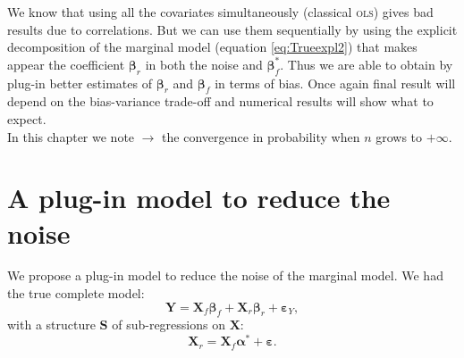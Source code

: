 \documentclass[12pt,a4paper]{report}
\begin{document}
		We know that using all the covariates simultaneously (classical \textsc{ols}) gives bad results due to correlations. But we can use them sequentially by using the explicit decomposition of the marginal model (equation \ref{eq:Trueexpl2}) that makes appear the coefficient $\boldsymbol{\beta}_r$ in both the noise and $\boldsymbol{\beta}_f^*$. Thus we are able to obtain by plug-in better estimates of $\boldsymbol{\beta}_r$ and $\boldsymbol{\beta}_f$ in terms of bias. Once again final result will depend on the bias-variance trade-off and numerical results will show what to expect.\\
		
		In this chapter we note $\longrightarrow$ the convergence in probability when $n$ grows to $+\infty$.
		\newpage
\section{A plug-in model  to reduce the noise}	
	We propose a plug-in model to reduce the noise of the marginal model.
	We had the true complete model:
\begin{equation}
		\boldsymbol{Y}%
		= \boldsymbol{X}_f\boldsymbol{\beta}_f+\boldsymbol{X}_r\boldsymbol{\beta}_r+\boldsymbol{\varepsilon}_Y, \nonumber 
\end{equation}		
	with a structure $\boldsymbol{S}$ of sub-regressions on $\boldsymbol{X}$:
	\begin{equation}
		\boldsymbol{X}_r 
		=\boldsymbol{X}_f\boldsymbol{\alpha}^*+\boldsymbol{\varepsilon}. \label{ssregplugin}
	\end{equation}
\end{document}
